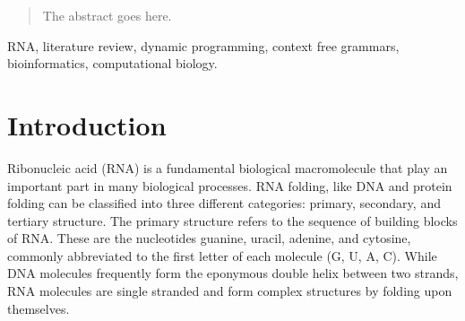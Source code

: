 \documentclass[journal]{IEEEtran}
\begin{document}







\maketitle

\begin{abstract}
The abstract goes here.
\end{abstract}

\begin{IEEEkeywords}
RNA, literature review, dynamic programming, context free grammars, bioinformatics, computational biology.
\end{IEEEkeywords}






%
\IEEEpeerreviewmaketitle



\section{Introduction}
\label{sec:intro}
Ribonucleic acid (RNA) is a fundamental biological macromolecule that play an important part in many biological processes. RNA folding, like DNA and protein folding can be classified into three different categories: primary, secondary, and tertiary structure. The primary structure refers to the sequence of building blocks of RNA. These are the nucleotides guanine, uracil, adenine, and cytosine, commonly abbreviated to the first letter of each molecule (G, U, A, C). While DNA molecules frequently form the eponymous double helix between two strands, RNA molecules are single stranded and form complex structures by folding upon themselves.
\end{document}

